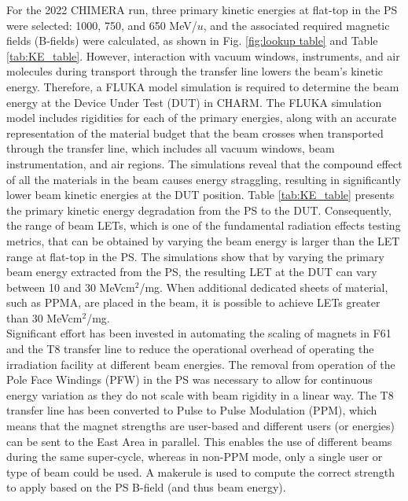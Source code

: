 \documentclass{cernatsnote}
\begin{document}
For the 2022 CHIMERA run, three primary kinetic energies at flat-top in the PS were selected: 1000, 750, and 650 MeV/$u$, and the associated required magnetic fields (B-fields) were calculated, as shown in Fig. \ref{fig:lookup table} and Table \ref{tab:KE_table}. However, interaction with vacuum windows, instruments, and air molecules during transport through the transfer line lowers the beam's kinetic energy. Therefore, a FLUKA model simulation is required to determine the beam energy at the Device Under Test (DUT) in CHARM. The FLUKA simulation model includes rigidities for each of the primary energies, along with an accurate representation of the material budget that the beam crosses when transported through the transfer line, which includes all vacuum windows, beam instrumentation, and air regions. The simulations reveal that the compound effect of all the materials in the beam causes energy straggling, resulting in significantly lower beam kinetic energies at the DUT position. Table \ref{tab:KE_table} presents the primary kinetic energy degradation from the PS to the DUT. Consequently, the range of beam LETs, which is one of the fundamental radiation effects testing metrics, that can be obtained by varying the beam energy is larger than the LET range at flat-top in the PS. The simulations show that by varying the primary beam energy extracted from the PS, the resulting LET at the DUT can vary between 10 and 30 MeVcm$^2$/mg. When additional dedicated sheets of material, such as PPMA, are placed in the beam, it is possible to achieve LETs greater than 30 MeVcm$^2$/mg.
\\

Significant effort has been invested in automating the scaling of magnets in F61 and the T8 transfer line to reduce the operational overhead of operating the irradiation facility at different beam energies. The removal from operation of the Pole Face Windings (PFW) in the PS was necessary to allow for continuous energy variation as they do not scale with beam rigidity in a linear way. The T8 transfer line has been converted to Pulse to Pulse Modulation (PPM), which means that the magnet strengths are user-based and different users (or energies) can be sent to the East Area in parallel. This enables the use of different beams during the same super-cycle, whereas in non-PPM mode, only a single user or type of beam could be used. A makerule is used to compute the correct strength to apply based on the PS B-field (and thus beam energy).
\\
\end{document}
